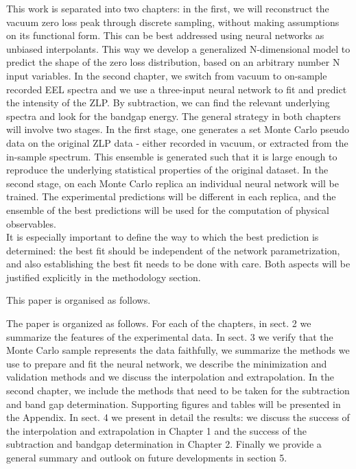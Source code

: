 This work is separated into two chapters: in the first, we will reconstruct the vacuum zero loss peak through discrete sampling, without making assumptions on its functional form. This can be best addressed using neural networks as unbiased interpolants. This way we develop a generalized N-dimensional model to predict the shape of the zero loss distribution, based on an arbitrary number N input variables. 
In the second chapter, we switch from vacuum to on-sample recorded EEL spectra and we use a three-input neural network to fit and predict the intensity of the ZLP. By subtraction, we can find the relevant underlying spectra and look for the bandgap energy.
The general strategy in both chapters will involve two stages. In the first stage, one generates a set Monte Carlo pseudo data on the original ZLP data - either recorded in vacuum, or extracted from the in-sample spectrum. This ensemble is generated such that it is large enough to reproduce the underlying statistical properties of the original dataset. In the second stage, on each Monte Carlo replica an individual neural network will be trained. The experimental predictions will be different in each replica, and the ensemble of the best predictions will be used for the computation of physical observables.\\
It is especially important to define the way to which the best prediction is determined: the best fit should be independent of the network parametrization, and also establishing the best fit needs to be done with care. Both aspects will be justified explicitly in the methodology section. 


This paper is organised as follows.

The paper is organized as follows. For each of the chapters, in sect. 2 we summarize the features of the experimental data. In sect. 3 we verify that the Monte Carlo sample represents the data faithfully, we summarize the methods we use to prepare and fit the neural network, we describe the minimization and validation methods and we discuss the interpolation and extrapolation. In the second chapter, we include the methods that need to be taken for the subtraction and band gap determination. Supporting figures and tables will be presented in the Appendix.
In sect. 4 we present in detail the results: we discuss the success of the interpolation and extrapolation in Chapter 1 and the success of the subtraction and bandgap determination in Chapter 2. Finally we provide a general summary and outlook on future developments in section 5. 

